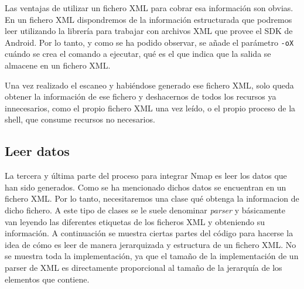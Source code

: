 Las ventajas de utilizar un fichero XML para cobrar esa información son obvias. En un fichero XML dispondremos de la información estructurada que podremos leer utilizando la librería para trabajar con archivos XML que provee el SDK de Android. Por lo tanto, y como se ha podido observar, se añade el parámetro \texttt{-oX} cuándo se crea el comando a ejecutar, qué es el que indica que la salida se almacene en un fichero XML.

Una vez realizado el escaneo y habiéndose generado ese fichero XML, solo queda obtener la información de ese fichero y deshacernos de todos los recursos ya innecesarios, como el propio fichero XML una vez leído, o el propio proceso de la shell, que consume recursos no necesarios.


\subsection{Leer datos}

La tercera y última parte del proceso para integrar Nmap es leer los datos que han sido generados. Como se ha mencionado dichos datos se encuentran en un fichero XML. Por lo tanto, necesitaremos una clase qué obtenga la informacion de dicho fichero. A este tipo de clases se le suele denominar \textit{parser} y básicamente van leyendo las diferentes etiquetas de los ficheros XML y obteniendo su información. A continuación se muestra ciertas partes del código para hacerse la idea de cómo es leer de manera jerarquizada y estructura de un fichero XML. No se muestra toda la implementación, ya que el tamaño de la implementación de un parser de XML es directamente proporcional al tamaño de la jerarquía de los elementos que contiene.


